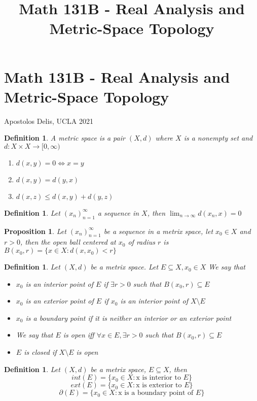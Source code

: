 \documentclass{article}
\title{Math 131B - Real Analysis and Metric-Space Topology}
\newtheorem{definition}[theorem]{Definition}
\newtheorem{proposition}[theorem]{Proposition}
\begin{document}
\section{Math 131B - Real Analysis and Metric-Space Topology}
Apostolos Delis, UCLA 2021

\begin{definition}
A metric space is a pair $(X, d)$ where $X$ is a nonempty set and
$d: X \times X \rightarrow [0, \infty)$
\begin{enumerate}
    \item $d(x,y) = 0\Leftrightarrow x = y$
    \item $d(x,y) = d(y,x)$
    \item $d(x,z) \le d(x,y) + d(y,z)$
\end{enumerate}
\end{definition}

\begin{definition}
    Let $(x_n)_{n=1}^{\infty}$ a sequence in $X$, then $\lim_{n \to \infty} d(x_n, x) = 0$
\end{definition}

\begin{proposition}
    Let $(x_n)_{n=1}^{\infty}$ be a sequence in a metrix space, let $x_0 \in X$ and
    $r>0$, then the open ball centered at $x_0$ of radius $r$ is
    $B(x_0,r)=\{x\in X: d(x,x_0) < r\}$
\end{proposition}

\begin{definition}
    Let $(X, d)$ be a metrix space. Let $E \subseteq X, x_0 \in X$ We say that
    \begin{itemize}
        \item $x_0$ is an interior point of $E$ if $\exists r > 0$ such that
            $B(x_0,r)\subseteq E$
        \item $x_0$ is an exterior point of $E$ if $x_0$ is an interior point of
            $X\setminus E$
        \item $x_0$ is a boundary point if it is neither an interior or an exterior point
        \item We say that $E$ is open iff $\forall x \in E, \exists r > 0$ such that
            $B(x_0,r) \subseteq E$
        \item $E$ is closed if $X\setminus E$ is open
    \end{itemize}
\end{definition}

\begin{definition}
    Let $(X, d)$ be a metrix space, $E \subseteq X$, then
    \begin{equation}
        int(E) = \{x_0 \in X: \text{x is interior to }E\}
    \end{equation}
    \begin{equation}
        ext(E) = \{x_0 \in X: \text{x is exterior to }E \}
    \end{equation}
    \begin{equation}
        \partial(E) = \{x_0 \in X: \text{x is a boundary point of }E\}
    \end{equation}
\end{definition}
\end{document}

